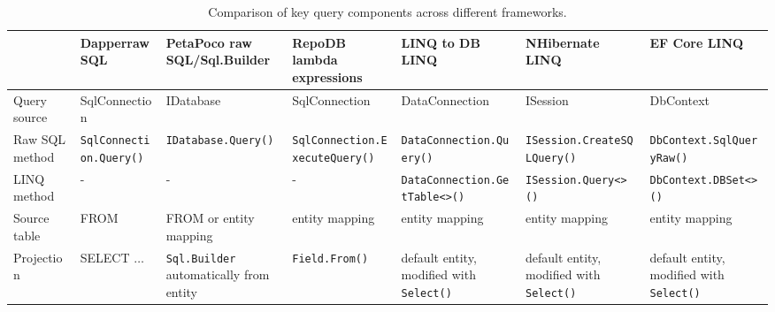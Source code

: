 \begin{landscape}
\begin{table}
\centering
\caption{Comparison of key query components across different frameworks.}
\label{tab:query_comp}
\scriptsize
\def\arraystretch{1.35}
\begin{tabular}{
>{\raggedright\arraybackslash}p{20.00mm}
>{\arraybackslash}p{30.00mm}
>{\arraybackslash}p{30.00mm}
>{\arraybackslash}p{30.00mm}
>{\arraybackslash}p{30.00mm}
>{\arraybackslash}p{30.00mm}
>{\arraybackslash}p{30.00mm}
}
\toprule
  &  \textbf{Dapper}\newline raw SQL &  \textbf{PetaPoco} \newline raw SQL/Sql.Builder &   \textbf{RepoDB} \newline lambda expressions &   \textbf{LINQ to DB} \newline LINQ & \textbf{NHibernate} \newline LINQ  &   \textbf{EF Core} \newline LINQ \\
\midrule

Query source  & SqlConnection & IDatabase & SqlConnection & DataConnection &  ISession & DbContext \\
\midrule

Raw SQL method  & \texttt{SqlConnection\newline.Query()} & \texttt{IDatabase\newline.Query()} & \texttt{SqlConnection\newline.ExecuteQuery()} & \texttt{DataConnection\newline.Query()} &  \texttt{ISession\newline.CreateSQLQuery()} & \texttt{DbContext\newline.SqlQueryRaw()} \\
\midrule

LINQ method & - & - & - & \texttt{DataConnection\newline.GetTable<>()} & \texttt{ISession\newline.Query<>()} & \texttt{DbContext\newline.DBSet<>()} \\
\midrule

Source table  & FROM & FROM or entity mapping & entity mapping  & entity mapping &  entity mapping & entity mapping \\
\midrule

Projection & SELECT $\ldots$ & \texttt{Sql.Builder} automatically from entity & \texttt{Field.From()}  & default entity, modified with \texttt{Select()} & default entity, modified with \texttt{Select()} & default entity, modified with \texttt{Select()} \\
\midrule


\end{tabular}
\end{table}
\end{landscape}
